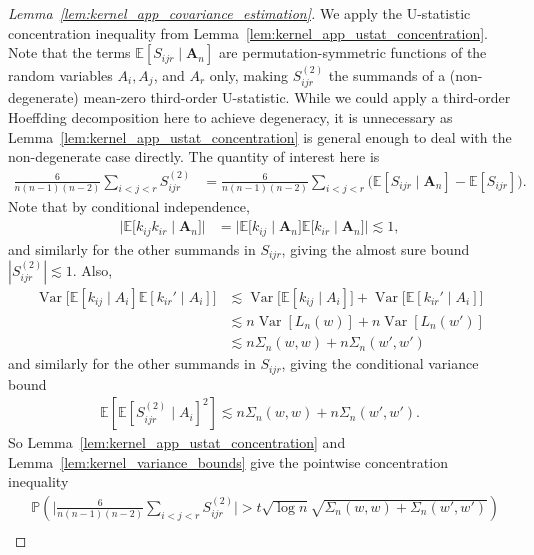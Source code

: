 \documentclass[11pt,lof]{puthesis}
\renewcommand{\P}{\ensuremath{\mathbb{P}}}
\newcommand{\E}{\ensuremath{\mathbb{E}}}
\newcommand{\bA}{\ensuremath{\mathbf{A}}}
\DeclareMathOperator{\Var}{Var}
\theoremstyle{break}
\theoremstyle{proof}
\newtheorem{proof}{Proof}
\begin{document}
\begin{proof}[Lemma~\ref{lem:kernel_app_covariance_estimation}]
  We apply the U-statistic concentration inequality from
  Lemma~\ref{lem:kernel_app_ustat_concentration}.
  Note that the terms
  $\E[S_{i j r} \mid \bA_n]$
  are permutation-symmetric functions of
  the random variables
  $A_i, A_j$, and $A_r$ only,
  making $S_{i j r}^{(2)}$ the summands of
  a (non-degenerate) mean-zero third-order U-statistic.
  While we could apply a third-order Hoeffding decomposition
  here to achieve degeneracy,
  it is unnecessary as Lemma~\ref{lem:kernel_app_ustat_concentration}
  is general enough to deal with the non-degenerate case directly.
  The quantity of interest here is
  \begin{align*}
    \frac{6}{n(n-1)(n-2)}
    \sum_{i<j<r}
    S_{i j r}^{(2)}
    &=
    \frac{6}{n(n-1)(n-2)}
    \sum_{i<j<r}
    \Big(
      \E[S_{i j r} \mid \bA_n]
      - \E[S_{i j r}]
    \Big).
  \end{align*}
  Note that by conditional independence,
  \begin{align*}
    \big|
    \E\big[
      k_{i j}k_{i r} \mid \bA_n
    \big]
    \big|
    &=
    \big|
    \E\big[
      k_{i j} \mid \bA_n
    \big]
    \E\big[
      k_{i r} \mid \bA_n
    \big]
    \big|
    \lesssim 1,
  \end{align*}
  and similarly for the other summands in $S_{i j r}$,
  giving the almost sure bound
  $|S_{i j r}^{(2)}| \lesssim 1$. Also,
  \begin{align*}
    \Var\big[ \E[k_{i j} \mid A_i] \E[k_{i r}' \mid A_i] \big]
    &\lesssim
    \Var\big[\E[k_{i j} \mid A_i]\big]
    + \Var\big[\E[k_{i r}' \mid A_i]\big] \\
    &\lesssim
    n \Var[L_n(w)] + n \Var[L_n(w')] \\
    &\lesssim
    n \Sigma_n(w,w) + n \Sigma_n(w',w')
  \end{align*}
  and similarly for the other summands in $S_{i j r}$,
  giving the conditional variance bound
  \begin{align*}
    \E[\E[S_{i j r}^{(2)} \mid A_i]^2] \lesssim
    n \Sigma_n(w,w) + n \Sigma_n(w',w').
  \end{align*}
  So Lemma~\ref{lem:kernel_app_ustat_concentration}
  and Lemma~\ref{lem:kernel_variance_bounds}
  give the pointwise concentration inequality
  \begin{align*}
    &\P\left(
      \Bigg|
      \frac{6}{n(n-1)(n-2)}
      \sum_{i<j<r}
      S_{i j r}^{(2)}
      \Bigg|
      > t \sqrt{\log n} \sqrt{\Sigma_n(w,w) + \Sigma_n(w',w')}
    \right) \\

\end{align*}
\end{proof}
\end{document}
